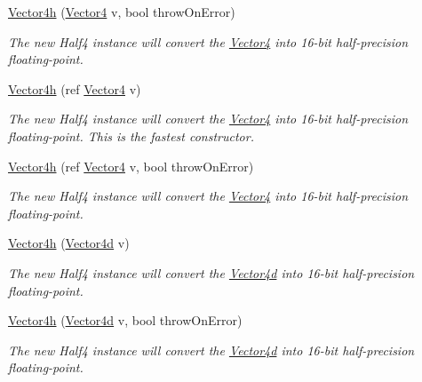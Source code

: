 \begin{DoxyCompactItemize}
\hyperlink{struct_open_t_k_1_1_vector4h_a70ad5f58087939839576e182815f96fe}{Vector4h} (\hyperlink{struct_open_t_k_1_1_vector4}{Vector4} v, bool throw\-On\-Error)
\begin{DoxyCompactList}\small\item\em The new Half4 instance will convert the \hyperlink{struct_open_t_k_1_1_vector4}{Vector4} into 16-\/bit half-\/precision floating-\/point. \end{DoxyCompactList}\item 
\hyperlink{struct_open_t_k_1_1_vector4h_a82d0f5a6ce443f7abf5d0884ba9a1d96}{Vector4h} (ref \hyperlink{struct_open_t_k_1_1_vector4}{Vector4} v)
\begin{DoxyCompactList}\small\item\em The new Half4 instance will convert the \hyperlink{struct_open_t_k_1_1_vector4}{Vector4} into 16-\/bit half-\/precision floating-\/point. This is the fastest constructor. \end{DoxyCompactList}\item 
\hyperlink{struct_open_t_k_1_1_vector4h_afba409a91dca334a3d3b1858cdaa5ddf}{Vector4h} (ref \hyperlink{struct_open_t_k_1_1_vector4}{Vector4} v, bool throw\-On\-Error)
\begin{DoxyCompactList}\small\item\em The new Half4 instance will convert the \hyperlink{struct_open_t_k_1_1_vector4}{Vector4} into 16-\/bit half-\/precision floating-\/point. \end{DoxyCompactList}\item 
\hyperlink{struct_open_t_k_1_1_vector4h_a6a3a31c6489eed949d2ab2065c953773}{Vector4h} (\hyperlink{struct_open_t_k_1_1_vector4d}{Vector4d} v)
\begin{DoxyCompactList}\small\item\em The new Half4 instance will convert the \hyperlink{struct_open_t_k_1_1_vector4d}{Vector4d} into 16-\/bit half-\/precision floating-\/point. \end{DoxyCompactList}\item 
\hyperlink{struct_open_t_k_1_1_vector4h_acfdba289f2fffbe4c42046048555733b}{Vector4h} (\hyperlink{struct_open_t_k_1_1_vector4d}{Vector4d} v, bool throw\-On\-Error)
\begin{DoxyCompactList}\small\item\em The new Half4 instance will convert the \hyperlink{struct_open_t_k_1_1_vector4d}{Vector4d} into 16-\/bit half-\/precision floating-\/point. \end{DoxyCompactList}\item 

\end{DoxyCompactItemize}
